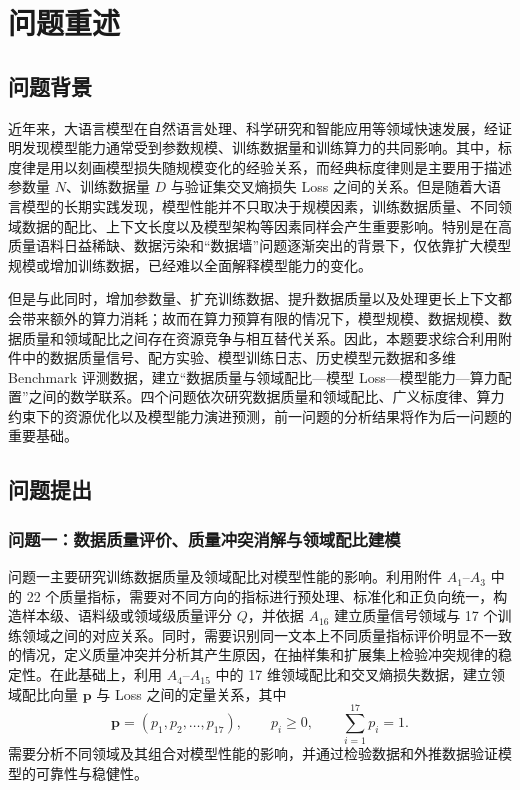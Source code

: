 
\section{问题重述}
\label{sec:problem-restatement}

\subsection{问题背景}

近年来，大语言模型在自然语言处理、科学研究和智能应用等领域快速发展，经证明发现模型能力通常受到参数规模、训练数据量和训练算力的共同影响。其中，标度律是用以刻画模型损失随规模变化的经验关系，而经典标度律则是主要用于描述参数量 $N$、训练数据量 $D$ 与验证集交叉熵损失 Loss 之间的关系。但是随着大语言模型的长期实践发现，模型性能并不只取决于规模因素，训练数据质量、不同领域数据的配比、上下文长度以及模型架构等因素同样会产生重要影响。特别是在高质量语料日益稀缺、数据污染和“数据墙”问题逐渐突出的背景下，仅依靠扩大模型规模或增加训练数据，已经难以全面解释模型能力的变化。

但是与此同时，增加参数量、扩充训练数据、提升数据质量以及处理更长上下文都会带来额外的算力消耗；故而在算力预算有限的情况下，模型规模、数据规模、数据质量和领域配比之间存在资源竞争与相互替代关系。因此，本题要求综合利用附件中的数据质量信号、配方实验、模型训练日志、历史模型元数据和多维 Benchmark 评测数据，建立“数据质量与领域配比—模型 Loss—模型能力—算力配置”之间的数学联系。四个问题依次研究数据质量和领域配比、广义标度律、算力约束下的资源优化以及模型能力演进预测，前一问题的分析结果将作为后一问题的重要基础。

\subsection{问题提出}

\subsubsection{问题一：数据质量评价、质量冲突消解与领域配比建模}

问题一主要研究训练数据质量及领域配比对模型性能的影响。利用附件 $A_1$--$A_3$ 中的 22 个质量指标，需要对不同方向的指标进行预处理、标准化和正负向统一，构造样本级、语料级或领域级质量评分 $Q$，并依据 $A_{16}$ 建立质量信号领域与 17 个训练领域之间的对应关系。同时，需要识别同一文本上不同质量指标评价明显不一致的情况，定义质量冲突并分析其产生原因，在抽样集和扩展集上检验冲突规律的稳定性。在此基础上，利用 $A_4$--$A_{15}$ 中的 17 维领域配比和交叉熵损失数据，建立领域配比向量 $\boldsymbol{p}$ 与 Loss 之间的定量关系，其中
\begin{equation}
  \boldsymbol{p}=(p_1,p_2,\ldots,p_{17}),\qquad
  p_i\geq 0,\qquad \sum_{i=1}^{17}p_i=1.
  \label{eq:problem-restatement-simplex}
\end{equation}
需要分析不同领域及其组合对模型性能的影响，并通过检验数据和外推数据验证模型的可靠性与稳健性。

